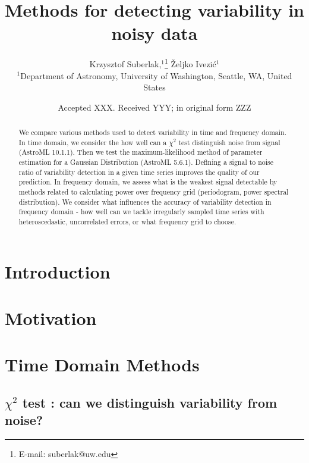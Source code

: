 \documentclass[fleqn,usenatbib]{mnras}  %
\title[Variability detection]{Methods for detecting variability in noisy data}
\author[K. Suberlak et al.]{
Krzysztof Suberlak,$^{1}$\thanks{E-mail: suberlak@uw.edu}
\v{Z}eljko Ivezi\'c$^{1}$
\\
$^{1}$Department of Astronomy, University of Washington, Seattle, WA, United States\\
}
\date{Accepted XXX. Received YYY; in original form ZZZ}
\begin{document}
\label{firstpage}
\pagerange{\pageref{firstpage}--\pageref{lastpage}}
\maketitle

\begin{abstract}

We compare various methods used to detect variability in time and frequency domain. In time domain, we consider the how well can a  $\chi^{2}$ test distinguish noise from signal (AstroML 10.1.1). Then we test the maximum-likelihood method of parameter estimation for a Gaussian Distribution (AstroML 5.6.1). Defining a signal to noise ratio of variability detection in a given time series improves the quality of our prediction.  
In frequency domain, we assess what is the weakest signal detectable by methods related to calculating power over frequency grid (periodogram, power spectral distribution). We consider what influences the accuracy of variability detection in frequency domain - how well can we tackle irregularly sampled time series with  heteroscedastic, uncorrelated errors, or what frequency grid to choose.  

\end{abstract}




\section{Introduction} 

\section{Motivation}

\section{Time Domain Methods}



%
%

\subsection{ $\chi^{2}$ test : can we distinguish variability from noise?}
\label{sec:chi2test}
\end{document}
